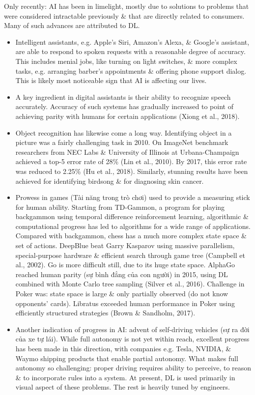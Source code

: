 \documentclass{article}
\begin{document}
\begin{enumerate}
\begin{itemize}
\begin{itemize}
			Only recently: AI has been in limelight, mostly due to solutions to problems that were considered intractable previously \& that are directly related to consumers. Many of such advances are attributed to DL.
			\begin{itemize}
				\item Intelligent assistants, e.g. Apple's Siri, Amazon's Alexa, \& Google's assistant, are able to respond to spoken requests with a reasonable degree of accuracy. This includes menial jobs, like turning on light switches, \& more complex tasks, e.g. arranging barber's appointments \& offering phone support dialog. This is likely most noticeable sign that AI is affecting our lives.
				\item A key ingredient in digital assistants is their ability to recognize speech accurately. Accuracy of such systems has gradually increased to point of achieving parity with humans for certain applications (Xiong et al., 2018).
				\item Object recognition has likewise come a long way. Identifying object in a picture was a fairly challenging task in 2010. On ImageNet benchmark researchers from NEC Labs \& University of Illinois at Urbana-Champaign achieved a top-5 error rate of 28\% (Lin et al., 2010). By 2017, this error rate was reduced to 2.25\% (Hu et al., 2018). Similarly, stunning results have been achieved for identifying birdsong \& for diagnosing skin cancer.
				\item Prowess in games (Tài năng trong trò chơi) used to provide a measuring stick for human ability. Starting from TD-Gammon, a program for playing backgammon using temporal difference reinforcement learning, algorithmic \& computational progress has led to algorithms for a wide range of applications. Compared with backgammon, chess has a much more complex state space \& set of actions. DeepBlue beat {\sc Garry Kasparov} using massive parallelism, special-purpose hardware \& efficient search through game tree (Campbell et al., 2002). Go is more difficult still, due to its huge state space. AlphaGo reached human parity (sự bình đẳng của con người) in 2015, using DL combined with Monte Carlo tree sampling (Silver et al., 2016). Challenge in Poker was: state space is large \& only partially observed (do not know opponents' cards). Libratus exceeded human performance in Poker using efficiently structured strategies (Brown \& Sandholm, 2017).
				\item Another indication of progress in AI: advent of self-driving vehicles (sự ra đời của xe tự lái). While full autonomy is not yet within reach, excellent progress has been made in this direction, with companies e.g. Tesla, NVIDIA, \& Waymo shipping products that enable partial autonomy. What makes full autonomy so challenging: proper driving requires ability to perceive, to reason \& to incorporate rules into a system. At present, DL is used primarily in visual aspect of these problems. The rest is heavily tuned by engineers.

\end{itemize}
\end{itemize}
\end{itemize}
\end{enumerate}
\end{document}
